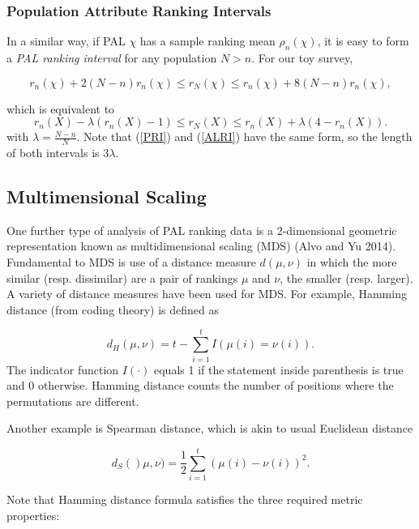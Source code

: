 \documentclass[a4paper, 12pt]{article}
\begin{document}
\subsubsection{Population Attribute Ranking Intervals}
In a similar way, if PAL $\chi$ has a sample ranking mean $\rho_n(\chi)$, it is easy to form  a \emph{PAL ranking interval} for any population $N>n$. For our toy survey,

\begin{equation}
r_n(\chi)+2(N-n)r_n(\chi)\le r_N(\chi) \le r_n(\chi)+8(N-n)r_n(\chi),
\end{equation}

{\flushleft which} is equivalent to  
\begin{equation}
r_n(X)-\lambda(r_n(X)-1)\le r_N(X) \le r_n(X) + \lambda(4-r_n(X)).
\label{ALRI}
\end{equation}
{\flushleft with} $\lambda=\frac{N-n}{N}$. Note that (\ref{PRI}) and (\ref{ALRI}) have the same form, so the length of both intervals is $3\lambda$.

\subsection{Multimensional Scaling}
One further type of analysis of PAL ranking data is a 2-dimensional geometric representation known as multidimensional scaling (MDS) (Alvo and Yu 2014). 
Fundamental to MDS is use of a distance measure $d(\mu,\nu)$ in which the more similar (resp. dissimilar) are a pair of rankings $\mu$ and $\nu$, the smaller (resp. larger).  A variety of distance measures have been used for MDS. For example, Hamming distance (from coding theory) is defined as
 
 \begin{equation}
 d_H{(\mu,\nu)}=t-\sum_{i=1}^t I(\mu(i)=\nu(i)).
 \end{equation}
 {\flushleft The} indicator function $I(\cdot)$ equals 1 if the statement inside parenthesis is true and 0 otherwise.  Hamming distance counts the number of positions where the permutations are different.
 
 
 Another example is Spearman distance, which is akin to usual Euclidean distance

\begin{equation}
d_S{()\mu,\nu)}=\frac{1}{2}\sum_{i=1}^t(\mu(i)-\nu(i))^2.
\end{equation}

{\flushleft Note} that Hamming distance formula satisfies the three required metric properties:
\end{document}
